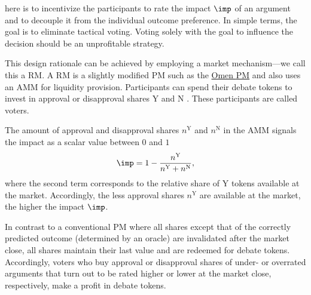 \documentclass[%
aip,
amsmath,amssymb,
reprint,%
unsortedaddress,
nofootinbib
]{revtex4-2}
\newcommand{\Y}{\text{Y}}
\newcommand{\N}{\text{N}}
\begin{document}
 here is to incentivize the participants to 
rate the impact $\imp$ of an argument and to decouple it from the individual outcome preference. 
In simple terms, the goal is to eliminate tactical voting.
Voting solely with the goal to influence the decision should be an unprofitable strategy.

This design rationale can be achieved by employing a market mechanism---we call this a \ac{RM}.
A \ac{RM} is a slightly modified \ac{PM} such as the \href{https://omen.eth.link/}{Omen \ac{PM}}\cite{Omen2020} and also uses an \ac{AMM}\cite{Zhang2018} for liquidity provision.
Participants can spend their debate tokens to invest in approval or disapproval shares $\Y$ and $\N$
.
These participants are called voters.

The amount of approval and disapproval shares $n^\Y$ and $n^\N$ in the \ac{AMM}
signals the impact as a scalar value between $0$ and $1$
\begin{equation}
	\imp = 1-\frac{n^\Y}{n^\Y+n^\N},
\end{equation}
where the second term corresponds to the relative share of $\Y$ tokens available at the market.
Accordingly, the less approval shares $n^\Y$ are available at the market, the higher the impact $\imp$.


In contrast to a conventional \ac{PM} where all shares except that of the correctly predicted outcome (determined by an oracle) are invalidated after the market close,
all shares maintain their last value and are redeemed for debate tokens. 
Accordingly, voters who buy approval or disapproval shares of under- or overrated arguments that turn out to be rated higher or lower at the market close, respectively, make a profit in debate tokens.
\end{document}
